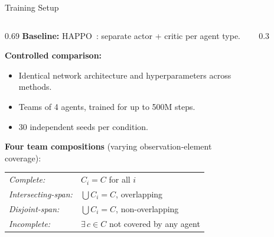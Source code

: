 \begin{frame}[shrink=10]{Training Setup}
    \vspace{2em}
    \begin{columns}
        \begin{column}{0.69\textwidth}
            \textbf{Baseline:} HAPPO~\cite{zhong2024}: separate actor + critic per agent type.
        
            \vspace{0.4em}
            \textbf{Controlled comparison:}
            \begin{itemize}
                \item Identical network architecture and hyperparameters across methods.
                \item Teams of 4 agents, trained for up to 500M steps.
                \item 30 independent seeds per condition.
            \end{itemize}
            \vspace{0.4em}
        
            \textbf{Four team compositions} (varying observation-element coverage):
            \renewcommand{\arraystretch}{1.05}
            \begin{tabular}{ll}
                \emph{Complete:} & $C_i = C$ for all $i$ \\
                \emph{Intersecting-span:} & $\bigcup C_i = C$, overlapping \\
                \emph{Disjoint-span:} & $\bigcup C_i = C$, non-overlapping \\
                \emph{Incomplete:} & $\exists\, c \in C$ not covered by any agent 
            \end{tabular}
        \end{column}
        \begin{column}{0.3\textwidth}
            \begin{figure}
            \end{figure}
        \end{column}
    \end{columns}



\end{frame}



